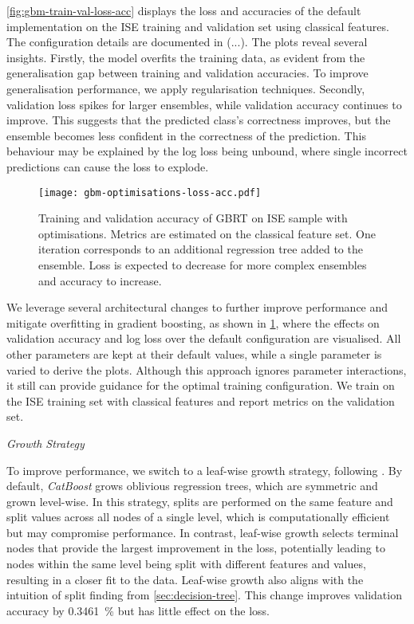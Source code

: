 \cref{fig:gbm-train-val-loss-acc} displays the loss and accuracies of the default implementation on the \gls{ISE} training and validation set using classical features. The configuration details are documented in (...). The plots reveal several insights. Firstly, the model overfits the training data, as evident from the generalisation gap between training and validation accuracies. To improve generalisation performance, we apply regularisation techniques. Secondly, validation loss spikes for larger ensembles, while validation accuracy continues to improve. This suggests that the predicted class's correctness improves, but the ensemble becomes less confident in the correctness of the prediction. This behaviour may be explained by the log loss being unbound, where single incorrect predictions can cause the loss to explode.
\begin{figure}[ht]
    \centering
    \texttt{[image: gbm-optimisations-loss-acc.pdf]}
    \caption[Training and Validation Accuracy of  on  with Optimisations]{Training and validation accuracy of \gls{GBRT} on \gls{ISE} sample with optimisations. Metrics are estimated on the classical feature set. One iteration corresponds to an additional regression tree added to the ensemble. Loss is expected to decrease for more complex ensembles and accuracy to increase.}
    \label{fig:gbm-optimisations-loss-acc}
\end{figure}

We leverage several architectural changes to further improve performance and mitigate overfitting in gradient boosting, as shown in \cref{fig:gbm-optimisations-loss-acc}, where the effects on validation accuracy and log loss over the default configuration are visualised. All other parameters are kept at their default values, while a single parameter is varied to derive the plots. Although this approach ignores parameter interactions, it still can provide guidance for the optimal training configuration. We train on the ISE training set with classical features and report metrics on the validation set.

\emph{Growth Strategy}

To improve performance, we switch to a leaf-wise growth strategy, following \textcite[][4]{chenXGBoostScalableTree2016}. By default, \emph{CatBoost} grows oblivious regression trees, which are symmetric and grown level-wise. In this strategy, splits are performed on the same feature and split values across all nodes of a single level, which is computationally efficient but may compromise performance. In contrast, leaf-wise growth selects terminal nodes that provide the largest improvement in the loss, potentially leading to nodes within the same level being split with different features and values, resulting in a closer fit to the data. Leaf-wise growth also aligns with the intuition of split finding from \cref{sec:decision-tree}. This change improves validation accuracy by \SI{0.3461}{\percent} but has little effect on the loss.

